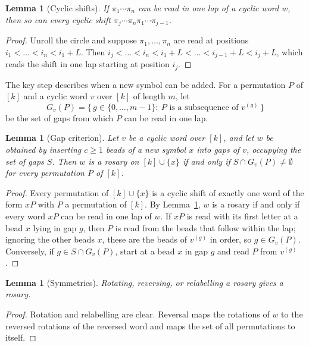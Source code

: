 \documentclass[a4paper,11pt]{amsart}
\newtheorem{lemma}[theorem]{Lemma}
\theoremstyle{remark}
\begin{document}
\begin{lemma}[Cyclic shifts]\label{lem:shift}
If $\pi_1\cdots\pi_n$ can be read in one lap of a cyclic word $w$, then so can
every cyclic shift $\pi_j\cdots\pi_n\pi_1\cdots\pi_{j-1}$.
\end{lemma}

\begin{proof}
Unroll the circle and suppose $\pi_1,\dots,\pi_n$ are read at positions
$i_1<\dots<i_n<i_1+L$.  Then
$i_j<\dots<i_n<i_1+L<\dots<i_{j-1}+L<i_j+L$, which reads the shift in one
lap starting at position $i_j$.
\end{proof}

The key step describes when a new symbol can be added.  For a permutation
$P$ of $[k]$ and a cyclic word $v$ over $[k]$ of length $m$, let
\[
  G_v(P)=\{\,g\in\{0,\dots,m-1\}:\ P \text{ is a subsequence of } v^{(g)}\,\}
\]
be the set of gaps from which $P$ can be read in one lap.

\begin{lemma}[Gap criterion]\label{lem:gap}
Let $v$ be a cyclic word over $[k]$, and let $w$ be obtained by inserting
$c\ge1$ beads of a new symbol $x$ into gaps of $v$, occupying the set of gaps
$S$.  Then $w$ is a rosary on $[k]\cup\{x\}$ if and only if $S\cap G_v(P)\ne
\emptyset$ for every permutation $P$ of $[k]$.
\end{lemma}

\begin{proof}
Every permutation of $[k]\cup\{x\}$ is a cyclic shift of exactly one word of
the form $xP$ with $P$ a permutation of $[k]$.  By Lemma~\ref{lem:shift},
$w$ is a rosary if and only if every word $xP$ can be read in one lap of $w$.
If $xP$ is read with its first letter at a bead $x$ lying in gap $g$, then
$P$ is read from the beads that follow within the lap; ignoring the other
beads $x$, these are the beads of $v^{(g)}$ in order, so $g\in G_v(P)$.
Conversely, if $g\in S\cap G_v(P)$, start at a bead $x$ in gap $g$ and read
$P$ from $v^{(g)}$.
\end{proof}

\begin{lemma}[Symmetries]\label{lem:sym}
Rotating, reversing, or relabelling a rosary gives a rosary.
\end{lemma}

\begin{proof}
Rotation and relabelling are clear.  Reversal maps the rotations of $w$ to
the reversed rotations of the reversed word and maps the set of all
permutations to itself.
\end{proof}
\end{document}
